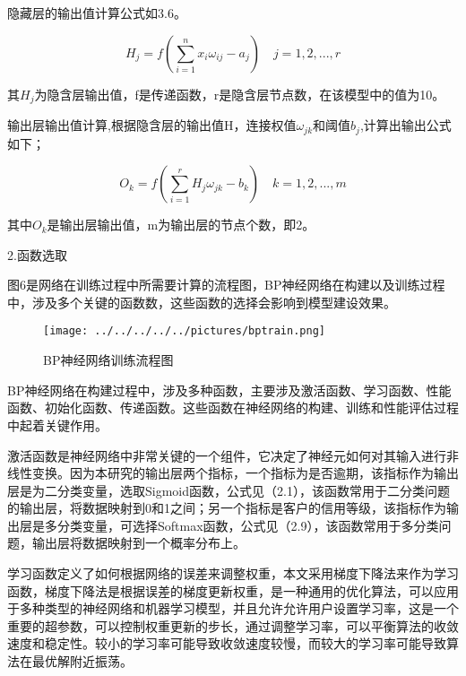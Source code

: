 隐藏层的输出值计算公式如3.6。

\begin{equation}
	H_j = f(\sum\limits_{i=1}^{n}x_i\omega_{ij}-a_j) \quad  j=1,2,...,r
\end{equation}

其$H_j$为隐含层输出值，f是传递函数，r是隐含层节点数，在该模型中的值为10。

输出层输出值计算,根据隐含层的输出值H，连接权值$\omega_{jk}$和阈值$b_j$,计算出输出公式如下；

\begin{equation}
	O_k = f(\sum\limits_{i=1}^{r}H_j\omega_{jk}-b_k) \quad k=1,2,...,m
\end{equation}

其中$O_k$是输出层输出值，m为输出层的节点个数，即2。



2.函数选取

图6是网络在训练过程中所需要计算的流程图，BP神经网络在构建以及训练过程中，涉及多个关键的函数数，这些函数的选择会影响到模型建设效果。

 \begin{figure}
	\centering
	\texttt{[image: ../../../../../pictures/bptrain.png]}
	\caption{BP神经网络训练流程图}
\end{figure}


BP神经网络在构建过程中，涉及多种函数，主要涉及激活函数、学习函数、性能函数、初始化函数、传递函数。这些函数在神经网络的构建、训练和性能评估过程中起着关键作用。

激活函数是神经网络中非常关键的一个组件，它决定了神经元如何对其输入进行非线性变换。因为本研究的输出层两个指标，一个指标为是否逾期，该指标作为输出层是为二分类变量，选取Sigmoid函数，公式见（2.1），该函数常用于二分类问题的输出层，将数据映射到0和1之间；另一个指标是客户的信用等级，该指标作为输出层是多分类变量，可选择Softmax函数，公式见（2.9），该函数常用于多分类问题，输出层将数据映射到一个概率分布上。

学习函数定义了如何根据网络的误差来调整权重，本文采用梯度下降法来作为学习函数，梯度下降法是根据误差的梯度更新权重，是一种通用的优化算法，可以应用于多种类型的神经网络和机器学习模型，并且允许允许用户设置学习率，这是一个重要的超参数，可以控制权重更新的步长，通过调整学习率，可以平衡算法的收敛速度和稳定性。较小的学习率可能导致收敛速度较慢，而较大的学习率可能导致算法在最优解附近振荡。


